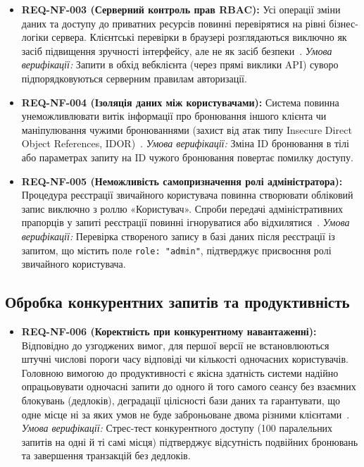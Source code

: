 \begin{itemize}[leftmargin=*,labelindent=0pt]
    \item \textbf{REQ-NF-003 (Серверний контроль прав RBAC):} Усі операції зміни даних та доступу до приватних ресурсів повинні перевірятися на рівні бізнес-логіки сервера. Клієнтські перевірки в браузері розглядаються виключно як засіб підвищення зручності інтерфейсу, але не як засіб безпеки~.
    \textit{Умова верифікації:} Запити в обхід вебклієнта (через прямі виклики API) суворо підпорядковуються серверним правилам авторизації.

    \item \textbf{REQ-NF-004 (Ізоляція даних між користувачами):} Система повинна унеможливлювати витік інформації про бронювання іншого клієнта чи маніпулювання чужими бронюваннями (захист від атак типу Insecure Direct Object References, IDOR)~.
    \textit{Умова верифікації:} Зміна ID бронювання в тілі або параметрах запиту на ID чужого бронювання повертає помилку доступу.

    \item \textbf{REQ-NF-005 (Неможливість самопризначення ролі адміністратора):} Процедура реєстрації звичайного користувача повинна створювати обліковий запис виключно з роллю «Користувач». Спроби передачі адміністративних прапорців у запиті реєстрації повинні ігноруватися або відхилятися~.
    \textit{Умова верифікації:} Перевірка створеного запису в базі даних після реєстрації із запитом, що містить поле \texttt{role: "admin"}, підтверджує присвоєння ролі звичайного користувача.
\end{itemize}

\subsection{Обробка конкурентних запитів та продуктивність}\label{sec:nefunktsional-konkurentnist}

\begin{itemize}[leftmargin=*,labelindent=0pt]
    \item \textbf{REQ-NF-006 (Коректність при конкурентному навантаженні):} Відповідно до узгоджених вимог, для першої версії не встановлюються штучні числові пороги часу відповіді чи кількості одночасних користувачів. Головною вимогою до продуктивності є якісна здатність системи надійно опрацьовувати одночасні запити до одного й того самого сеансу без взаємних блокувань (дедлоків), деградації цілісності бази даних та гарантувати, що одне місце ні за яких умов не буде заброньоване двома різними клієнтами~.
    \textit{Умова верифікації:} Стрес-тест конкурентного доступу (100 паралельних запитів на одні й ті самі місця) підтверджує відсутність подвійних бронювань та завершення транзакцій без дедлоків.
\end{itemize}
